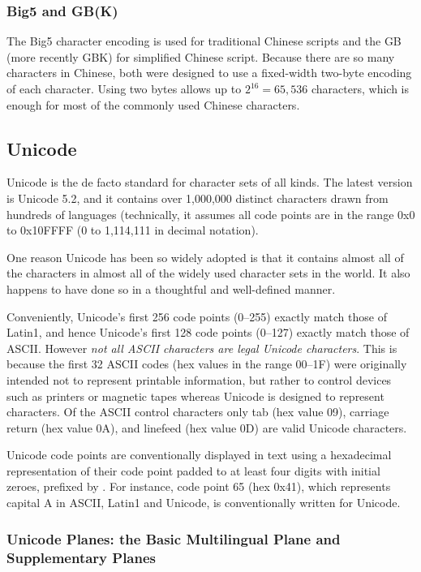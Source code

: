 \subsubsection{Big5 and GB(K)}

The Big5 character encoding is used for traditional Chinese scripts
and the GB (more recently GBK) for simplified Chinese script.  Because
there are so many characters in Chinese, both were designed to use a
fixed-width two-byte encoding of each character.  Using two bytes
allows up to $2^{16} = 65,536$ characters, which is enough for most
of the commonly used Chinese characters.

\subsection{Unicode}\label{section:unicode}

Unicode is the de facto standard for character sets of all kinds.  The
latest version is Unicode 5.2, and it contains over 1,000,000 distinct
characters drawn from hundreds of languages (technically, it assumes
all code points are in the range 0x0 to 0x10FFFF (0 to 1,114,111 in
decimal notation).

One reason Unicode has been so widely adopted is that it contains
almost all of the characters in almost all of the widely used
character sets in the world.  It also happens to have done so in a
thoughtful and well-defined manner.

Conveniently, Unicode's first 256 code points (0--255) exactly match
those of Latin1, and hence Unicode's first 128 code points (0--127)
exactly match those of ASCII.
However \emph{not all ASCII characters are legal Unicode characters}.
This is because the first 32 ASCII codes (hex values in the range 00--1F) 
were originally intended not to
represent printable information, but rather to control devices such as printers
or magnetic tapes whereas Unicode is designed to represent characters.
Of the ASCII control characters only tab (hex value 09), carriage return (hex value 0A), 
and linefeed (hex value 0D) are valid Unicode characters.

Unicode code points are conventionally displayed in text using a
hexadecimal representation of their code point padded to at least four
digits with initial zeroes, prefixed by .  For instance, code
point 65 (hex 0x41), which represents capital A in ASCII, Latin1 and
Unicode, is conventionally written  for Unicode.

\subsubsection{Unicode Planes: the Basic Multilingual Plane and Supplementary Planes}\label{section:unicode-planes}


